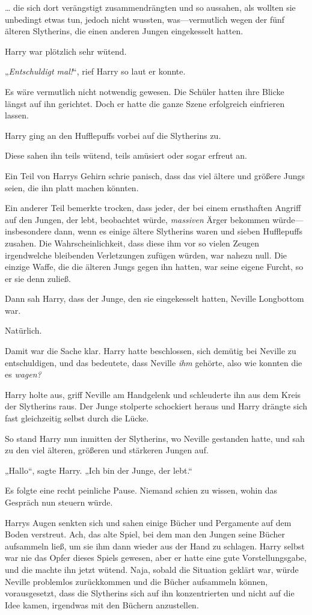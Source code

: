 {… die sich dort verängstigt zusammendrängten und so aussahen, als wollten sie unbedingt etwas tun, jedoch nicht wussten, was—vermutlich wegen der fünf älteren Slytherins, die einen anderen Jungen eingekesselt hatten.

Harry war plötzlich sehr wütend.

„\emph{Entschuldigt mal!}“, rief Harry so laut er konnte.

Es wäre vermutlich nicht notwendig gewesen. Die Schüler hatten ihre Blicke längst auf ihn gerichtet. Doch er hatte die ganze Szene erfolgreich einfrieren lassen.

Harry ging an den Hufflepuffs vorbei auf die Slytherins zu.

Diese sahen ihn teils wütend, teils amüsiert oder sogar erfreut an.

Ein Teil von Harrys Gehirn schrie panisch, dass das viel ältere und größere Jungs seien, die ihn platt machen könnten.

Ein anderer Teil bemerkte trocken, dass jeder, der bei einem ernsthaften Angriff auf den Jungen, der lebt, beobachtet würde, \emph{massiven} Ärger bekommen würde—insbesondere dann, wenn es einige ältere Slytherins waren und sieben Hufflepuffs zusahen. Die Wahrscheinlichkeit, dass diese ihm vor so vielen Zeugen irgendwelche bleibenden Verletzungen zufügen würden, war nahezu null. Die einzige Waffe, die die älteren Jungs gegen ihn hatten, war seine eigene Furcht, so er sie denn zuließ.

Dann sah Harry, dass der Junge, den sie eingekesselt hatten, Neville Longbottom war.

Natürlich.

Damit war die Sache klar. Harry hatte beschlossen, sich demütig bei Neville zu entschuldigen, und das bedeutete, dass Neville \emph{ihm} gehörte, also wie konnten die es \emph{wagen?}

Harry holte aus, griff Neville am Handgelenk und schleuderte ihn aus dem Kreis der Slytherins raus. Der Junge stolperte schockiert heraus und Harry drängte sich fast gleichzeitig selbst durch die Lücke.

So stand Harry nun inmitten der Slytherins, wo Neville gestanden hatte, und sah zu den viel älteren, größeren und stärkeren Jungen auf.

„Hallo“, sagte Harry. „Ich bin der Junge, der lebt.“

Es folgte eine recht peinliche Pause. Niemand schien zu wissen, wohin das Gespräch nun steuern würde.

Harrys Augen senkten sich und sahen einige Bücher und Pergamente auf dem Boden verstreut. Ach, das alte Spiel, bei dem man den Jungen seine Bücher aufsammeln ließ, um sie ihm dann wieder aus der Hand zu schlagen. Harry selbst war nie das Opfer dieses Spiels gewesen, aber er hatte eine gute Vorstellungsgabe, und die machte ihn jetzt wütend. Naja, sobald die Situation geklärt war, würde Neville problemlos zurückkommen und die Bücher aufsammeln können, vorausgesetzt, dass die Slytherins sich auf ihn konzentrierten und nicht auf die Idee kamen, irgendwas mit den Büchern anzustellen.

}

